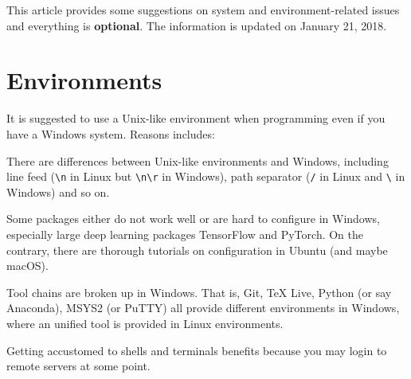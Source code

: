\documentclass[english]{../TeXTemplate/pkupaper}
\title{\titlemark}
\author{pppppass}
\date{\today}
\begin{document}
\maketitle

This article provides some suggestions on system and environment-related issues and everything is \textbf{optional}. The information is updated on January 21, 2018.

\section{Environments}

It is suggested to use a Unix-like environment when programming even if you have a Windows system. Reasons includes:
\begin{partlist}
\item There are differences between Unix-like environments and Windows, including line feed (\verb"\n" in Linux but \verb"\n\r" in Windows), path separator (\verb"/" in Linux and \verb"\" in Windows) and so on.
\item Some packages either do not work well or are hard to configure in Windows, especially large deep learning packages TensorFlow and PyTorch. On the contrary, there are thorough tutorials on configuration in Ubuntu (and maybe macOS).
\item Tool chains are broken up in Windows. That is, Git, TeX Live, Python (or say Anaconda), MSYS2 (or PuTTY) all provide different environments in Windows, where an unified tool is provided in Linux environments.
\item Getting accustomed to shells and terminals benefits because you may login to remote servers at some point.
\end{partlist}
\end{document}
